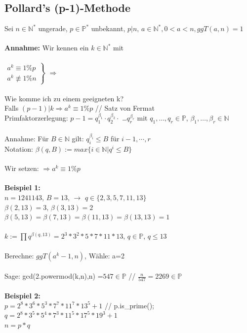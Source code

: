 \documentclass[10pt]{article}
\newcommand{\NN}{\mathbb{N}} %
\newcommand{\PN}{\mathbb{P}} %
\newcommand{\ra}{\rightarrow}
\newcommand{\Ra}{\Rightarrow}
\newcommand{\Brackar}[2]{\left.\begin{array}{#1} #2 \end{array}\right\rbrace} %
\begin{document}
\subsection{Pollard's (p-1)-Methode}
Sei $n \in \NN^*$ ungerade, $p \in \PN^*$ unbekannt, $p|n$, $a \in \NN^*, 0< a < n, ggT(a,n)=1$ \\
\\
\textbf{Annahme:}
Wir kennen ein $k\in \NN^*$ mit \\ \\
$\Brackar{l}{a^k \equiv 1 \% p \\ a^k \not\equiv 1 \% n} $ $\Ra$  \\
\\
Wie komme ich zu einem geeigneten k? \\
Falls $(p-1)|k \Ra a^k \equiv 1 \% p$ // Satz von Fermat \\
Primfaktorzerlegung:  $p-1 = q_1^{\beta_1} \cdot q_2^{\beta_2} \cdot$ \dots $q_r^{\beta_r}$ 
mit $q_1, \dots, q_r \in \PN$, 
$\beta_1, \dots, \beta_r \in \NN$ \\
\\
Annahme: Für $B \in \NN$ gilt: $q_i^{\beta_i} \leq B$ für $i-1, \cdots, r$ \\
Notation: $\beta(q,B):=max\{i\in\NN | q^i \leq B\}$ \\
\\
Wir setzen: \fbox{$k:=\prod q^{\beta(q,B)}$\\$q\in \PN$\\$q \leq B$} $\Ra a^k \equiv 1 \% p$ \\
\\
\textbf{Beispiel 1:} \\
$n=1241143$, $B=13$, $\ra$ $q \in \{2,3,5,7,11,13\}$ \\
$\beta(2,13)=3$, $\beta(3,13)=2$ \\
$\beta(5,13)=\beta(7,13)=\beta(11,13)=\beta(13,13)=1$ \\
\\
$k:= \prod q^{\beta(q,13)}=2^3*3^2*5*7*11*13$, $q\in\PN$, $q\leq 13$ \\
\\
Berechne: $ggT(a^k-1,n)$, Wähle: a=2 \\
\\
Sage: gcd(2.powermod(k,n),n) =$547 \in \PN$ // $\frac{n}{547} = 2269 \in \PN$ \\
\\
\textbf{Beispiel 2:} \\
$p=2^8*3^6*5^3*7^7*11^7*13^5+1$ // p.is\_prime(); \\
$q=2^8*3^5*5^4*7^3*11^5*17^5*19^3+1$ \\
$n=p*q$ \\
\end{document}
